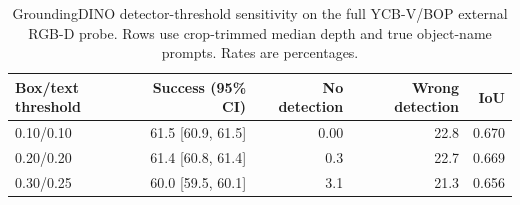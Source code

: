 \begin{table}[t]
\centering
\caption{GroundingDINO detector-threshold sensitivity on the full YCB-V/BOP external RGB-D probe. Rows use crop-trimmed median depth and true object-name prompts. Rates are percentages.}
\label{tab:external-rgbd-detector-threshold}
\scriptsize
\begin{tabular}{lrrrr}
\toprule
Box/text threshold & Success (95\% CI) & No detection & Wrong detection & IoU \\
\midrule
0.10/0.10 & 61.5 [60.9, 61.5] & 0.00 & 22.8 & 0.670 \\
0.20/0.20 & 61.4 [60.8, 61.4] & 0.3 & 22.7 & 0.669 \\
0.30/0.25 & 60.0 [59.5, 60.1] & 3.1 & 21.3 & 0.656 \\
\bottomrule
\end{tabular}
\end{table}
